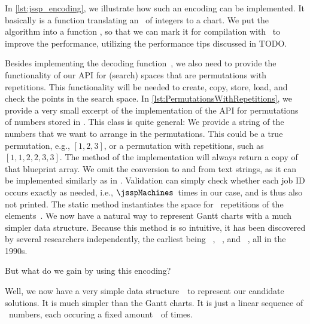 In \autoref{lst:jssp_encoding}, we illustrate how such an encoding can be implemented.
It basically is a function translating an \numpyndarray\ of integers to a  chart.
We put the algorithm into a function , so that we can mark it for compilation with \numba\ to improve the performance, utilizing the performance tips discussed in TODO.


Besides implementing the decoding function~\decode, we also need to provide the functionality of our  API for (search) spaces that are permutations with repetitions.
This functionality will be needed to create, copy, store, load, and check the points in the search space.
In \autoref{lst:PermutationsWithRepetitions}, we provide a very small excerpt of the implementation of the  API for permutations of numbers stored in \numpyndarrays.
This class is quite general:
We provide a  string of the numbers that we want to arrange in the permutations.
This could be a true permutation, e.g., $[1, 2, 3]$, or a permutation with repetitions, such as $[1, 1, 2, 2, 3, 3]$.
The  method of the  implementation will always return a copy of that blueprint array.
We omit the conversion to and from text strings, as it can be implemented similarly as in .
Validation can simply check whether each job ID occurs exactly as needed, i.e., $\jsspMachines$~times in our case, and is thus also not printed.
The static method  instantiates the space for \jsspMachines~repetitions of the elements~.%
%
\endhsection%
%
%
%
We now have a natural way to represent Gantt charts with a much simpler data structure.
Because this method is so intuitive, it has been discovered by several researchers independently, the earliest being \citeauthor{GTK1994SJSSPBGA}~\cite{GTK1994SJSSPBGA}, \citeauthor{B1995AGPATJSSWGA}~\cite{B1995AGPATJSSWGA,BMK1996OPRFSP}, and \citeauthor{SIS1997NESFSJSPBGA}~\cite{SIS1997NESFSJSPBGA}, all in the 1990s.

But what do we gain by using this encoding?

Well, we now have a very simple data structure~\searchSpace\ to represent our candidate solutions.
It is much simpler than the Gantt charts.
It is just a linear sequence of \jsspJobs~numbers, each occuring a fixed amount~\jsspMachines\ of times.

